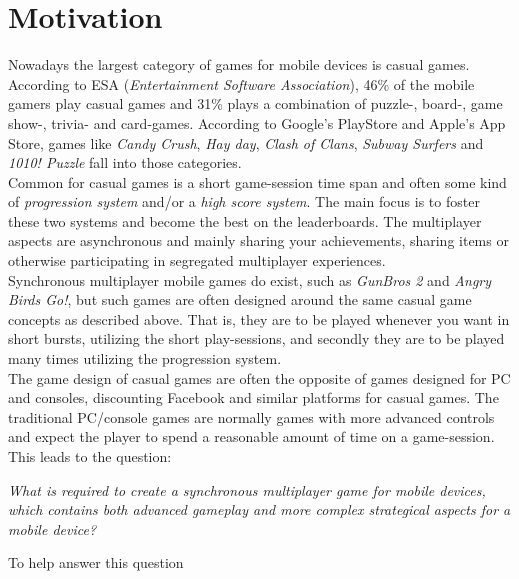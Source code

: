 \section{Motivation} \label{sec:motivation}
Nowadays the largest category of games for mobile devices is casual games. According to ESA\cite{ESA}\cite{ESApdf}
(\textit{Entertainment Software Association}), 46\% of the mobile gamers play casual games and 31\% plays a combination
of puzzle-, board-, game show-, trivia- and card-games.  According to Google's PlayStore \cite{googleplay} and Apple's
App Store\cite{appstore}, games like \textit{Candy Crush}, \textit{Hay day}, \textit{Clash of Clans}, \textit{Subway
Surfers} and \textit{1010! Puzzle} fall into those categories.\\

Common for casual games is a short game-session time span and often some kind of \textit{progression system} and/or
a \textit{high score system}. The main focus is to foster these two systems and become the best on the leaderboards.
The multiplayer aspects are asynchronous and mainly sharing your achievements, sharing items or otherwise participating
in segregated multiplayer experiences.\\

Synchronous multiplayer mobile games do exist, such as \textit{GunBros 2} and \textit{Angry Birds Go!}, but such games
are often designed around the same casual game concepts as described above. That is, they are to be played whenever
you want in short bursts, utilizing the short play-sessions, and secondly they are to be played many times utilizing
the progression system.\\

The game design of casual games are often the opposite of games designed for PC and consoles, discounting Facebook
and similar platforms for casual games. The traditional PC/console games are normally games with more advanced controls
and expect the player to spend a reasonable amount of time on a game-session. This leads to the question:
\begin{center}\label{intro:problem_statement}
\textit{What is required to create a synchronous multiplayer game for mobile devices, which contains both advanced
gameplay and more complex strategical aspects for a mobile device?}
\end{center}

To help answer this question 


